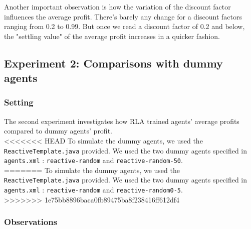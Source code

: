 \documentclass[11pt]{article}
\begin{document}
Another important observation is how the variation of the discount factor influences the average profit. There's barely any change for a discount factors ranging from 0.2 to 0.99. But once we read a discount factor of 0.2 and below, the "settling value" of the average profit increases in a quicker fashion.\\

\subsection{Experiment 2: Comparisons with dummy agents}

\subsubsection{Setting}
The second experiment investigates how RLA trained agents' average profits compared to dummy agents' profit.\\

<<<<<<< HEAD
To simulate the dummy agents, we used the \texttt{ReactiveTemplate.java} provided. We used the two dummy agents specified in \texttt{agents.xml} : \texttt{reactive-random} and \texttt{reactive-random-50}.\\
=======
To simulate the dummy agents, we used the \texttt{ReactiveTemplate.java} provided. We used the two dummy agents specified in \texttt{agents.xml} : \texttt{reactive-random} and \texttt{reactive-random0-5}.\\
>>>>>>> 1e75bb8896baca0fb89475ba8f238416ff612df4

\subsubsection{Observations}
\end{document}
